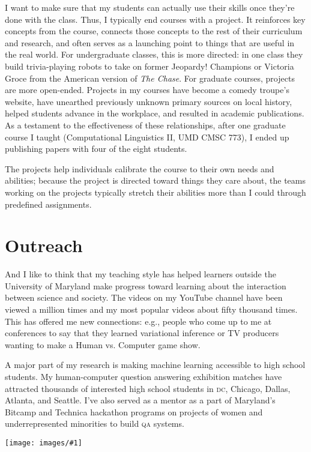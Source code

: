 \documentclass[11pt]{amsart}
\newcommand{\abr}[1]{\textsc{#1}}
\newcommand{\image}[2]{  \begin{center}
\texttt{[image: images/\#1]}
\end{center}
  }
\begin{document}
I want to make sure that my students can actually use their skills
once they're done with the class.  Thus, I typically end courses with
a project.  It reinforces key concepts from the course, connects those
concepts to the rest of their curriculum and research, and often
serves as a launching point to things that are useful in the real
world.  For undergraduate classes, this is more directed: in one class
they build trivia-playing robots to take on former Jeopardy! Champions
or Victoria Groce from the American version of \textit{The Chase}.  For
graduate courses, projects are more open-ended.  Projects in my
courses have become a comedy troupe's website, have unearthed
previously unknown primary sources on local history, helped students
advance in the workplace, and resulted in academic publications.  As a
testament to the effectiveness of these relationships, after one
graduate course I taught (Computational Linguistics II, UMD CMSC 773),
I ended up publishing papers with four of the eight students.

The projects help individuals calibrate the course to their own needs
and abilities; because the project is directed toward things they care
about, the teams working on the projects typically stretch their
abilities more than I could through predefined assignments.

\section{Outreach}

And I like to think that my teaching style has helped learners outside
the University of Maryland make progress toward learning about the
interaction between science and society.  The videos on my YouTube
channel have been viewed a million times and my most popular videos
about fifty thousand times.  This has offered me new connections:
e.g., people who come up to me at conferences to say that they learned
variational inference or TV producers wanting to make a Human
vs. Computer game show.

A major part of my research is making machine learning accessible to
high school students.
%
My human-computer question answering exhibition matches have attracted
thousands of interested high school students in \abr{dc}, Chicago,
Dallas, Atlanta, and Seattle.
%
I've also served as a mentor as a part of Maryland's Bitcamp and
Technica hackathon programs on projects of women and underrepresented
minorities to build \abr{qa} systems.

\image{atlanta_hsnct}{}
\end{document}
